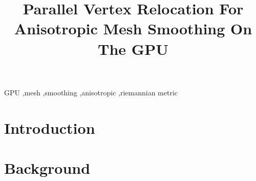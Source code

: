 \documentclass[preprint,12pt]{elsarticle}
\begin{document}
\begin{frontmatter}



\title{Parallel Vertex Relocation For Anisotropic Mesh Smoothing On The GPU}


\author{}

\address{}

\begin{abstract}

\end{abstract}

\begin{keyword}
	GPU \sep mesh \sep smoothing \sep anisotropic \sep riemannian metric



\end{keyword}

\end{frontmatter}


\section{Introduction}
\label{}


\section{Background}
\label{}
\end{document}
